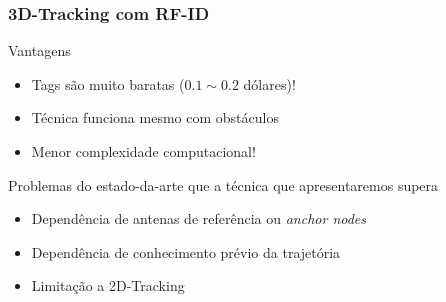 \begin{frame}
  \frametitle{3D-Tracking com RF-ID}

  Vantagens
  \begin{itemize}
    \item  Tags são muito baratas ($0.1 \sim 0.2$ dólares)!
    \item  Técnica funciona mesmo com obstáculos
    \item  Menor complexidade computacional!
  \end{itemize}

  Problemas do estado-da-arte que a técnica que apresentaremos supera
  \begin{itemize}
    \item  Dependência de antenas de referência ou \emph{anchor nodes} 
    \item  Dependência de conhecimento prévio da trajetória
    \item  Limitação a 2D-Tracking
  \end{itemize}
\end{frame}
